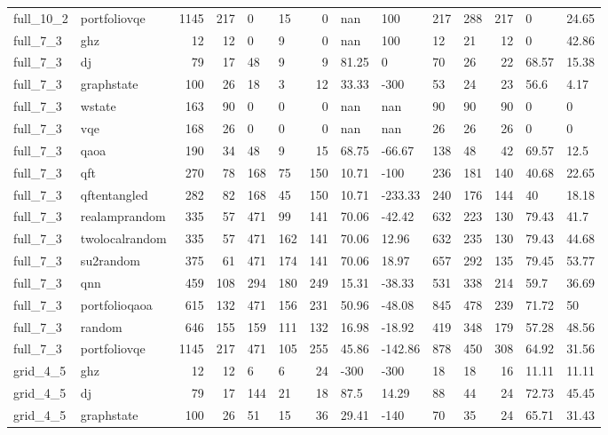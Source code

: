 \begin{longtable}{llrrllrllllrll}
full\_10\_2 & portfoliovqe & 1145 & 217 & 0 & 15 & 0 & nan & 100 & 217 & 288 & 217 & 0 & 24.65 \\
full\_7\_3 & ghz & 12 & 12 & 0 & 9 & 0 & nan & 100 & 12 & 21 & 12 & 0 & 42.86 \\
full\_7\_3 & dj & 79 & 17 & 48 & 9 & 9 & 81.25 & 0 & 70 & 26 & 22 & 68.57 & 15.38 \\
full\_7\_3 & graphstate & 100 & 26 & 18 & 3 & 12 & 33.33 & -300 & 53 & 24 & 23 & 56.6 & 4.17 \\
full\_7\_3 & wstate & 163 & 90 & 0 & 0 & 0 & nan & nan & 90 & 90 & 90 & 0 & 0 \\
full\_7\_3 & vqe & 168 & 26 & 0 & 0 & 0 & nan & nan & 26 & 26 & 26 & 0 & 0 \\
full\_7\_3 & qaoa & 190 & 34 & 48 & 9 & 15 & 68.75 & -66.67 & 138 & 48 & 42 & 69.57 & 12.5 \\
full\_7\_3 & qft & 270 & 78 & 168 & 75 & 150 & 10.71 & -100 & 236 & 181 & 140 & 40.68 & 22.65 \\
full\_7\_3 & qftentangled & 282 & 82 & 168 & 45 & 150 & 10.71 & -233.33 & 240 & 176 & 144 & 40 & 18.18 \\
full\_7\_3 & realamprandom & 335 & 57 & 471 & 99 & 141 & 70.06 & -42.42 & 632 & 223 & 130 & 79.43 & 41.7 \\
full\_7\_3 & twolocalrandom & 335 & 57 & 471 & 162 & 141 & 70.06 & 12.96 & 632 & 235 & 130 & 79.43 & 44.68 \\
full\_7\_3 & su2random & 375 & 61 & 471 & 174 & 141 & 70.06 & 18.97 & 657 & 292 & 135 & 79.45 & 53.77 \\
full\_7\_3 & qnn & 459 & 108 & 294 & 180 & 249 & 15.31 & -38.33 & 531 & 338 & 214 & 59.7 & 36.69 \\
full\_7\_3 & portfolioqaoa & 615 & 132 & 471 & 156 & 231 & 50.96 & -48.08 & 845 & 478 & 239 & 71.72 & 50 \\
full\_7\_3 & random & 646 & 155 & 159 & 111 & 132 & 16.98 & -18.92 & 419 & 348 & 179 & 57.28 & 48.56 \\
full\_7\_3 & portfoliovqe & 1145 & 217 & 471 & 105 & 255 & 45.86 & -142.86 & 878 & 450 & 308 & 64.92 & 31.56 \\
grid\_4\_5 & ghz & 12 & 12 & 6 & 6 & 24 & -300 & -300 & 18 & 18 & 16 & 11.11 & 11.11 \\
grid\_4\_5 & dj & 79 & 17 & 144 & 21 & 18 & 87.5 & 14.29 & 88 & 44 & 24 & 72.73 & 45.45 \\
grid\_4\_5 & graphstate & 100 & 26 & 51 & 15 & 36 & 29.41 & -140 & 70 & 35 & 24 & 65.71 & 31.43 \\

\end{longtable}

